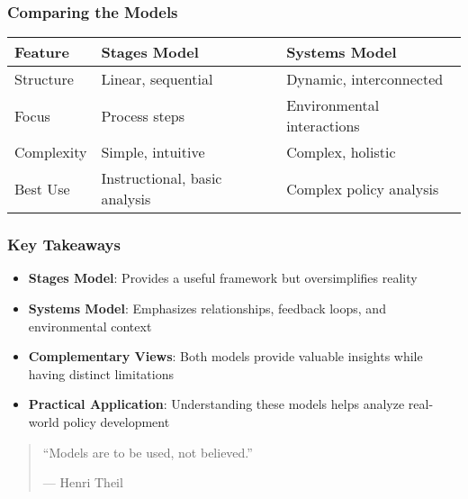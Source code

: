 \documentclass[10pt]{beamer}
\begin{document}
\begin{frame}
\frametitle{Comparing the Models}

\begin{table}
\centering
\begin{tabular}{|l|l|l|}
\hline
\textbf{Feature} & \textbf{Stages Model} & \textbf{Systems Model} \\
\hline
\pause
Structure & Linear, sequential & Dynamic, interconnected \\
\hline
\pause
Focus & Process steps & Environmental interactions \\
\hline
\pause
Complexity & Simple, intuitive & Complex, holistic \\
\hline
\pause
Best Use & Instructional, basic analysis & Complex policy analysis \\
\hline
\end{tabular}
\end{table}

\end{frame}

\begin{frame}
\frametitle{Key Takeaways}

\begin{block}{}
\begin{itemize}
\item \textbf{Stages Model}: Provides a useful framework but oversimplifies reality
\item \textbf{Systems Model}: Emphasizes relationships, feedback loops, and environmental context
\item \textbf{Complementary Views}: Both models provide valuable insights while having distinct limitations
\item \textbf{Practical Application}: Understanding these models helps analyze real-world policy development
\end{itemize}
\end{block}

\vspace{1cm}

\begin{quotation}
``Models are to be used, not believed.''

\vspace{0.3cm}
\hfill --- Henri Theil
\end{quotation}

\end{frame}
\end{document}
